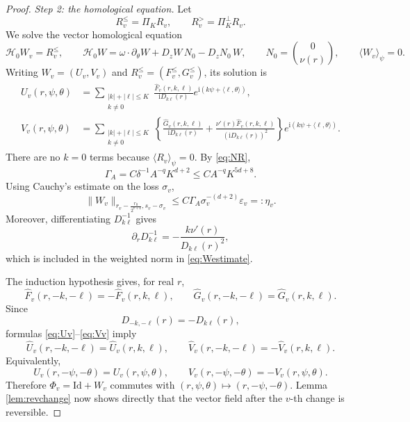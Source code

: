 \documentclass[11pt]{amsart}
\theoremstyle{remark}
\newcommand{\ii}{\mathrm i}
\newcommand{\eps}{\varepsilon}
\newcommand{\av}[1]{\langle #1\rangle}
\newcommand{\norm}[1]{\lVert #1\rVert}
\newcommand{\Id}{\mathrm{Id}}
\begin{document}
\begin{proof}
\smallskip
\noindent\emph{Step 2: the homological equation.}
Let
\[
 R_v^{\leq}=\Pi_KR_v,\qquad R_v^>=\Pi_K^\perp R_v.
\]
We solve the vector homological equation
\begin{equation}\label{eq:homological}
 \mathcal H_0W_v=R_v^{\leq},\qquad
 \mathcal H_0W
 =\omega\cdot\partial_\theta W+
 D_zW\,N_0-D_zN_0\,W,\qquad
 N_0=\binom0{\nu(r)},
\qquad \av{W_v}_{\psi}=0.
\end{equation}
Writing $W_v=(U_v,V_v)$ and
$R_v^{\leq}=(F_v^{\leq},G_v^{\leq})$, its solution is
\begin{align}
 U_v(r,\psi,\theta)
 &=\sum_{\substack{|k|+|\ell|\leq K\\k\neq0}}
 \frac{\widehat F_v(r,k,\ell)}
 {\ii D_{k\ell}(r)}
 e^{\ii(k\psi+\langle\ell,\theta\rangle)},\label{eq:Uv}\\
 V_v(r,\psi,\theta)
 &=\sum_{\substack{|k|+|\ell|\leq K\\k\neq0}}
 \left\{
 \frac{\widehat G_v(r,k,\ell)}
 {\ii D_{k\ell}(r)}
 +\frac{\nu'(r)\widehat F_v(r,k,\ell)}
 {(\ii D_{k\ell}(r))^2}
 \right\}
 e^{\ii(k\psi+\langle\ell,\theta\rangle)}.
\label{eq:Vv}
\end{align}
There are no $k=0$ terms because $\av{R_v}_{\psi}=0$.
By \eqref{eq:NR},
\begin{equation}\label{eq:Gamma}
 \Gamma_A=
 C\delta^{-1}A^{-q}K^{d+2}
 \leq CA^{-q}K^{5d+8}.
\end{equation}
Using Cauchy's estimate on the loss $\sigma_v$,
\begin{equation}\label{eq:Westimate}
 \norm{W_v}_{r_v-\frac{r_0}{2^{v+4}},s_v-\sigma_v}
 \leq
 C\Gamma_A\sigma_v^{-(d+2)}\eps_v
 =:\eta_v.
\end{equation}
Moreover, differentiating $D_{k\ell}^{-1}$ gives
\[
 \partial_r D_{k\ell}^{-1}
 =-\frac{k\nu'(r)}{D_{k\ell}(r)^2},
\]
which is included in the weighted norm in \eqref{eq:Westimate}.

The induction hypothesis gives, for real $r$,
\begin{equation}\label{eq:FourierParity}
 \widehat F_v(r,-k,-\ell)=-\widehat F_v(r,k,\ell),
 \qquad
 \widehat G_v(r,-k,-\ell)= \widehat G_v(r,k,\ell).
\end{equation}
Since
\begin{equation}\label{eq:divisorParity}
 D_{-k,-\ell}(r)=-D_{k\ell}(r),
\end{equation}
formulas \eqref{eq:Uv}--\eqref{eq:Vv} imply
\[
 \widehat U_v(r,-k,-\ell)=\widehat U_v(r,k,\ell),
 \qquad
 \widehat V_v(r,-k,-\ell)=-\widehat V_v(r,k,\ell).
\]
Equivalently,
\begin{equation}\label{eq:Wparity}
 U_v(r,-\psi,-\theta)=U_v(r,\psi,\theta),\qquad
 V_v(r,-\psi,-\theta)=-V_v(r,\psi,\theta).
\end{equation}
Therefore $\Phi_v=\Id+W_v$ commutes with
$(r,\psi,\theta)\mapsto(r,-\psi,-\theta)$.  Lemma
\ref{lem:revchange} now shows directly that the vector field after the
$v$-th change is reversible.


\end{proof}
\end{document}
